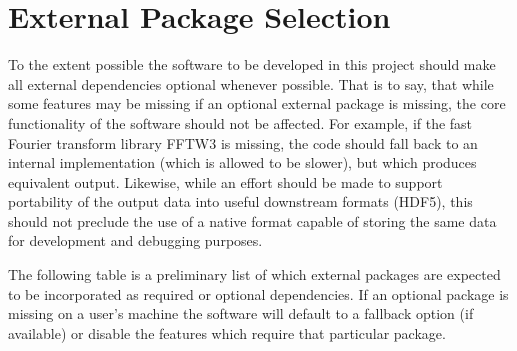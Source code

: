 \documentclass[hidelinks]{article}
\let\Oldsection\section
\renewcommand{\section}{\FloatBarrier\Oldsection}
\begin{document}
\section{External Package Selection}

To the extent possible the software to be developed in this project should make all external dependencies optional whenever possible. That is to say, that
while some features may be missing if an optional external package is missing, the core functionality of the software should not be affected. For example, if the fast Fourier transform library FFTW3 is missing, the code should fall back to an internal implementation (which is allowed to be slower), but which produces equivalent output. Likewise, while an effort should be made to support portability of the output data into useful downstream formats (HDF5), this should not preclude the use of a native format capable of storing the same data for development and debugging purposes. 

The following table is a preliminary list of which external packages are expected to be incorporated as required or optional dependencies. If an optional package is missing on a user's machine the software will default to a fallback option (if available) or disable the features which require that particular package.
\end{document}
